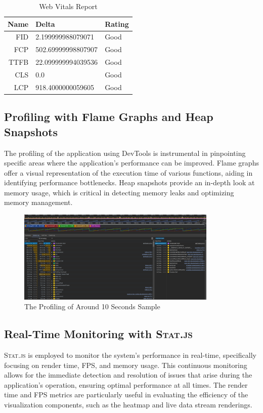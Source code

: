 \begin{table}[h!]
  \centering
  \begin{tabular}{|r|l|l|}
    \hline
    Name & Delta              & Rating \\ [0.5ex]
    \hline\hline
    FID  & 2.199999988079071  & Good   \\
    \hline
    FCP  & 502.69999998807907 & Good   \\
    \hline
    TTFB & 22.099999994039536 & Good   \\
    \hline
    CLS  & 0.0                & Good   \\
    \hline
    LCP  & 918.4000000059605  & Good   \\[1ex]
    \hline
  \end{tabular}
  \caption{\label{table:webvitals}Web Vitals Report}
\end{table}


\subsection{Profiling with Flame Graphs and Heap Snapshots}
The profiling of the application using DevTools is instrumental in pinpointing specific areas where the application's performance can be improved. Flame graphs offer a visual representation of the execution time of various functions, aiding in identifying performance bottlenecks. Heap snapshots provide an in-depth look at memory usage, which is critical in detecting memory leaks and optimizing memory management.

\begin{figure}[htbp]
  \centering
  \includegraphics[width=0.85\textwidth]{Pictures/profiling}
  \caption{\label{fig:profiling}The Profiling of Around 10 Seconds Sample}
\end{figure}
\subsection{Real-Time Monitoring with \textsc{Stat.js}}
\textsc{Stat.js} is employed to monitor the system's performance in real-time, specifically focusing on render time, FPS, and memory usage. This continuous monitoring allows for the immediate detection and resolution of issues that arise during the application's operation, ensuring optimal performance at all times. The render time and FPS metrics are particularly useful in evaluating the efficiency of the visualization components, such as the heatmap and live data stream renderings.

